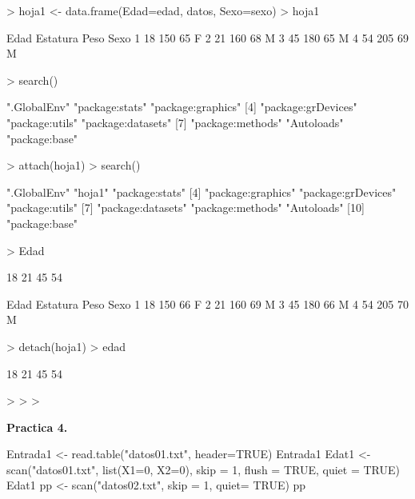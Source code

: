 \documentclass{article}
\begin{document}
\begin{Schunk}
\begin{Soutput}
\end{Soutput}
\begin{Sinput}
> hoja1 <- data.frame(Edad=edad, datos, Sexo=sexo)
> hoja1
\end{Sinput}
\begin{Soutput}
  Edad Estatura Peso Sexo
1   18      150   65    F
2   21      160   68    M
3   45      180   65    M
4   54      205   69    M
\end{Soutput}
\begin{Sinput}
> search()
\end{Sinput}
\begin{Soutput}
[1] ".GlobalEnv"        "package:stats"     "package:graphics" 
[4] "package:grDevices" "package:utils"     "package:datasets" 
[7] "package:methods"   "Autoloads"         "package:base"     
\end{Soutput}
\begin{Sinput}
> attach(hoja1)
> search()
\end{Sinput}
\begin{Soutput}
 [1] ".GlobalEnv"        "hoja1"             "package:stats"    
 [4] "package:graphics"  "package:grDevices" "package:utils"    
 [7] "package:datasets"  "package:methods"   "Autoloads"        
[10] "package:base"     
\end{Soutput}
\begin{Sinput}
> Edad
\end{Sinput}
\begin{Soutput}
[1] 18 21 45 54
\end{Soutput}
\begin{Soutput}
  Edad Estatura Peso Sexo
1   18      150   66    F
2   21      160   69    M
3   45      180   66    M
4   54      205   70    M
\end{Soutput}
\begin{Sinput}
> detach(hoja1)
> edad
\end{Sinput}
\begin{Soutput}
[1] 18 21 45 54
\end{Soutput}
\begin{Sinput}
> 
> 
> 
\end{Sinput}
\end{Schunk}

\textbf{Practica 4.}



Entrada1 <- read.table("datos01.txt", header=TRUE)
Entrada1
Edat1 <- scan("datos01.txt", list(X1=0, X2=0), skip = 1, flush = TRUE, quiet = TRUE)
Edat1
pp <- scan("datos02.txt", skip = 1, quiet= TRUE)
pp
\end{document}
